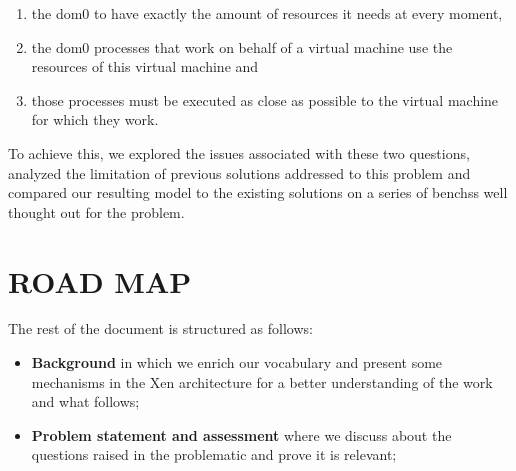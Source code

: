 \begin{enumerate}
    \item the dom0 to have exactly the amount of resources it needs at every moment,
    \item the dom0 processes that work on behalf of a virtual machine use the resources of this virtual machine and 
    \item those processes must be executed as close as possible to the virtual machine for which they work.
\end{enumerate}

To achieve this, we explored the issues associated with these two questions, analyzed the limitation of previous solutions addressed to this problem and compared our resulting model to the existing solutions on a series of \glspl{bench}s well thought out for the problem.

\section*{ROAD MAP}
The rest of the document is structured as follows: 

\begin{itemize}
    \item \textbf{Background} in which we enrich our vocabulary and present some mechanisms in the Xen architecture for a better understanding of the work and what follows;
    \item \textbf{Problem statement and assessment} where we discuss about the questions raised in the problematic and prove it is relevant;
    
\end{itemize} 
